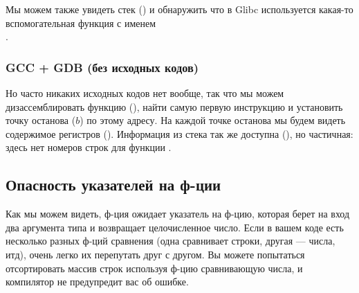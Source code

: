 Мы можем также увидеть стек () и обнаружить что в Glibc используется какая-то вспомогательная функция с именем\\
.



\subsubsection{GCC + GDB (без исходных кодов)}

Но часто никаких исходных кодов нет вообще, так что мы можем дизассемблировать функцию \comp (), 
найти самую первую инструкцию \CMP и установить точку останова ($b$) по этому адресу.
На каждой точке останова мы будем видеть содержимое регистров ().
Информация из стека так же доступна (), 
но частичная: здесь нет номеров строк для функции \comp.



\subsection{Опасность указателей на ф-ции}

Как мы можем видеть, ф-ция \qsort ожидает указатель на ф-цию, которая берет на вход два аргумента типа 
и возвращает целочисленное число.
Если в вашем коде есть несколько разных ф-ций сравнения (одна сравнивает строки, другая --- числа, итд), очень
легко их перепутать друг с другом.
Вы можете попытаться отсортировать массив строк используя ф-цию сравнивающую числа, и компилятор не предупредит вас
об ошибке.


